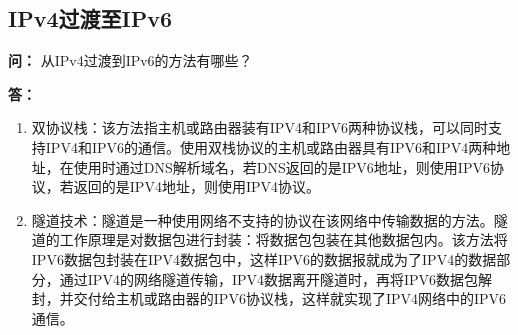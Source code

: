\documentclass[12pt,hyperref,a4paper,UTF8]{ctexart}
\begin{document}
    \begin{table}[H]
        \centering
        \caption{249.155.251.15}\label{249.155.251.15}
    \end{table}


\subsection{IPv4过渡至IPv6}
\textbf{问：}
从IPv4过渡到IPv6的方法有哪些？

\textbf{答：}
\begin{enumerate}
    \item 双协议栈：该方法指主机或路由器装有IPV4和IPV6两种协议栈，可以同时支持IPV4和IPV6的通信。使用双栈协议的主机或路由器具有IPV6和IPV4两种地址，在使用时通过DNS解析域名，若DNS返回的是IPV6地址，则使用IPV6协议，若返回的是IPV4地址，则使用IPV4协议。
    \item 隧道技术：隧道是一种使用网络不支持的协议在该网络中传输数据的方法。隧道的工作原理是对数据包进行封装：将数据包包装在其他数据包内。该方法将IPV6数据包封装在IPV4数据包中，这样IPV6的数据报就成为了IPV4的数据部分，通过IPV4的网络隧道传输，IPV4数据离开隧道时，再将IPV6数据包解封，并交付给主机或路由器的IPV6协议栈，这样就实现了IPV4网络中的IPV6通信。
\end{enumerate}
\end{document}
